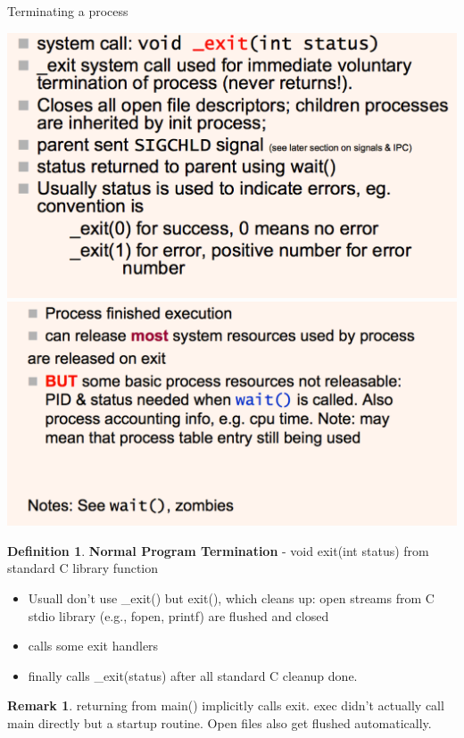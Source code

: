 \documentclass[12pt,a4paper]{article}
\theoremstyle{definition}
\newtheorem*{remark}{Remark}
\newtheorem{definition}{Definition}[section]
\newenvironment{myitemize}
{ \begin{itemize}
    \setlength{\itemsep}{5pt}
    \setlength{\parskip}{0pt}
    \setlength{\parsep}{0pt}     }
{ \end{itemize}                  }
\begin{document}
\begin{tcolorbox}
	\textsf{Terminating a process}
	
	\includegraphics[scale=0.33]{m1/terminatingProcess1}
	\includegraphics[scale=0.33]{m1/terminatingProcess2}
	\centering
\end{tcolorbox}

\begin{definition}{\textbf{Normal Program Termination} - \textsf{void exit(int status)} from standard C library function}
	\begin{myitemize}
		\item Usuall don't use \textsf{\_exit()} but \textsf{exit()}, which cleans up: open streams from C stdio library (e.g., fopen, printf) are flushed and closed
		\item calls some exit handlers
		\item finally calls \textsf{\_exit(status)} after all standard C cleanup done.
	\end{myitemize}
\end{definition}
\begin{remark}
	returning from \textsf{main()} implicitly calls exit. \textsf{exec} didn't actually call main directly but a startup routine. Open files also get flushed automatically.
\end{remark}
\end{document}
